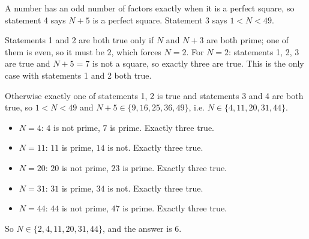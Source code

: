 A number has an odd number of factors exactly when it is a perfect square, so statement 4 says $N+5$ is a perfect square. Statement 3 says $1<N<49$.

Statements 1 and 2 are both true only if $N$ and $N+3$ are both prime; one of them is even, so it must be $2$, which forces $N=2$. For $N=2$: statements 1, 2, 3 are true and $N+5=7$ is not a square, so exactly three are true. This is the only case with statements 1 and 2 both true.

Otherwise exactly one of statements 1, 2 is true and statements 3 and 4 are both true, so $1<N<49$ and $N+5\in\{9,16,25,36,49\}$, i.e. $N\in\{4,11,20,31,44\}$.
\begin{itemize}
\item $N=4$: $4$ is not prime, $7$ is prime. Exactly three true.
\item $N=11$: $11$ is prime, $14$ is not. Exactly three true.
\item $N=20$: $20$ is not prime, $23$ is prime. Exactly three true.
\item $N=31$: $31$ is prime, $34$ is not. Exactly three true.
\item $N=44$: $44$ is not prime, $47$ is prime. Exactly three true.
\end{itemize}
So $N\in\{2,4,11,20,31,44\}$, and the answer is $\boxed{6}$.
